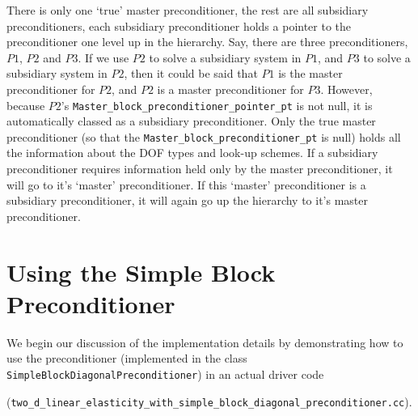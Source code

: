 There is only one `true' master preconditioner, the rest are all subsidiary preconditioners, each subsidiary preconditioner holds a pointer to the preconditioner one level up in the hierarchy. Say, there are three preconditioners, $P1$, $P2$ and $P3$. If we use $P2$ to solve a subsidiary system in $P1$, and $P3$ to solve a subsidiary system in $P2$, then it could be said that $P1$ is the master preconditioner for $P2$, and $P2$ is a master preconditioner for $P3$. However, because $P2$'s \verb+Master_block_preconditioner_pointer_pt+ is not null, it is automatically classed as a subsidiary preconditioner. Only the true master preconditioner (so that the \verb+Master_block_preconditioner_pt+ is null) holds all the information about the DOF types and look-up schemes. If a subsidiary preconditioner requires information held only by the master preconditioner, it will go to it's `master' preconditioner. If this `master' preconditioner is a subsidiary preconditioner, it will again go up the hierarchy to it's master preconditioner.

\section{Using the Simple Block Preconditioner\label{sec:using_the_simple_block_preconditioner}}

We begin our discussion of the implementation details by demonstrating how to use the preconditioner (implemented in the class \verb+SimpleBlockDiagonalPreconditioner+) in an actual driver code 

(\verb+two_d_linear_elasticity_with_simple_block_diagonal_preconditioner.cc+).

